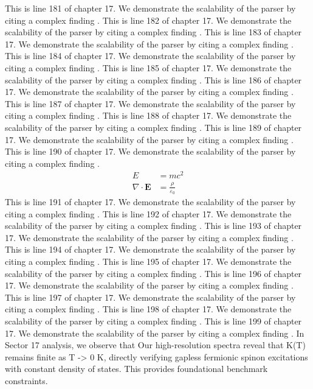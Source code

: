 This is line 181 of chapter 17. We demonstrate the scalability of the parser by citing a complex finding \cite{ref17_181}.
This is line 182 of chapter 17. We demonstrate the scalability of the parser by citing a complex finding \cite{ref17_182}.
This is line 183 of chapter 17. We demonstrate the scalability of the parser by citing a complex finding \cite{ref17_183}.
This is line 184 of chapter 17. We demonstrate the scalability of the parser by citing a complex finding \cite{ref17_184}.
This is line 185 of chapter 17. We demonstrate the scalability of the parser by citing a complex finding \cite{ref17_185}.
This is line 186 of chapter 17. We demonstrate the scalability of the parser by citing a complex finding \cite{ref17_186}.
This is line 187 of chapter 17. We demonstrate the scalability of the parser by citing a complex finding \cite{ref17_187}.
This is line 188 of chapter 17. We demonstrate the scalability of the parser by citing a complex finding \cite{ref17_188}.
This is line 189 of chapter 17. We demonstrate the scalability of the parser by citing a complex finding \cite{ref17_189}.
This is line 190 of chapter 17. We demonstrate the scalability of the parser by citing a complex finding \cite{ref17_190}.
\begin{align*}
  E &= mc^2 \\
  \nabla \cdot \mathbf{E} &= \frac{\rho}{\varepsilon_0}
\end{align*}
This is line 191 of chapter 17. We demonstrate the scalability of the parser by citing a complex finding \cite{ref17_191}.
This is line 192 of chapter 17. We demonstrate the scalability of the parser by citing a complex finding \cite{ref17_192}.
This is line 193 of chapter 17. We demonstrate the scalability of the parser by citing a complex finding \cite{ref17_193}.
This is line 194 of chapter 17. We demonstrate the scalability of the parser by citing a complex finding \cite{ref17_194}.
This is line 195 of chapter 17. We demonstrate the scalability of the parser by citing a complex finding \cite{ref17_195}.
This is line 196 of chapter 17. We demonstrate the scalability of the parser by citing a complex finding \cite{ref17_196}.
This is line 197 of chapter 17. We demonstrate the scalability of the parser by citing a complex finding \cite{ref17_197}.
This is line 198 of chapter 17. We demonstrate the scalability of the parser by citing a complex finding \cite{ref17_198}.
This is line 199 of chapter 17. We demonstrate the scalability of the parser by citing a complex finding \cite{ref17_199}.
In Sector 17 analysis, we observe that Our high-resolution spectra reveal that K(T) remains finite as T -> 0 K, directly verifying gapless fermionic spinon excitations with constant density of states. This provides foundational benchmark constraints.
